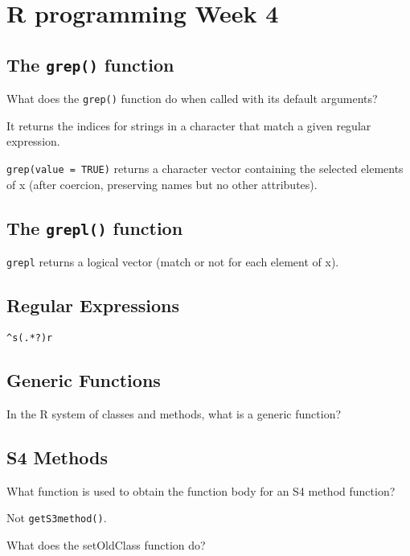 \documentclass[11pt]{article} %
\begin{document}
\tableofcontents
\newpage
\section{R programming Week 4}

\subsection*{The \texttt{grep()} function }
 What does the \texttt{grep()} function do when called with its default arguments?
 
 It returns the indices for strings in a character that match a given regular expression.

\texttt{grep(value = TRUE)} returns a character vector containing the selected elements of x (after coercion, preserving names but no other attributes).
\subsection*{The \texttt{grepl()} function }


\texttt{grepl} returns a logical vector (match or not for each element of x).
\subsection*{Regular Expressions}
\begin{framed}
\begin{verbatim}
^s(.*?)r
\end{verbatim}
\end{framed}
\subsection*{Generic Functions}
In the R system of classes and methods, what is a generic function?


\subsection*{S4 Methods}
What function is used to obtain the function body for an S4 method function?

Not \texttt{getS3method()}. 

What does the setOldClass function do?

\newpage
\end{document}
